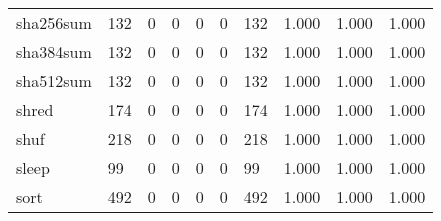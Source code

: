 \begin{longtable}{lp{1.3cm}p{1.3cm}p{1.3cm}p{1.3cm}p{1.3cm}p{1.3cm}p{1.3cm}p{1.3cm}p{1.3cm}}
sha256sum &                    132 &                                  0 &                                 0 &                                0 &                                 0 &                             132 &                                1.000 &                                  1.000 &                                1.000 \\
sha384sum &                    132 &                                  0 &                                 0 &                                0 &                                 0 &                             132 &                                1.000 &                                  1.000 &                                1.000 \\
sha512sum &                    132 &                                  0 &                                 0 &                                0 &                                 0 &                             132 &                                1.000 &                                  1.000 &                                1.000 \\
shred     &                    174 &                                  0 &                                 0 &                                0 &                                 0 &                             174 &                                1.000 &                                  1.000 &                                1.000 \\
shuf      &                    218 &                                  0 &                                 0 &                                0 &                                 0 &                             218 &                                1.000 &                                  1.000 &                                1.000 \\
sleep     &                     99 &                                  0 &                                 0 &                                0 &                                 0 &                              99 &                                1.000 &                                  1.000 &                                1.000 \\
sort      &                    492 &                                  0 &                                 0 &                                0 &                                 0 &                             492 &                                1.000 &                                  1.000 &                                1.000 \\

\end{longtable}

